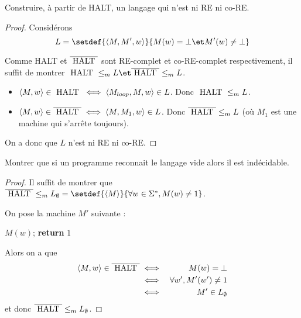 \begin{exercice}
	Construire, à partir de HALT, un langage qui n'est ni RE ni co-RE.
\end{exercice}

\begin{proof}
	Considérons
	$$ L = \setdef {\encode {M,M',w}} {M(w) = \bot \et M'(w) \neq \bot} $$

	Comme HALT et $\overline {\text{ HALT }}$ sont RE-complet et co-RE-complet respectivement, il suffit de montrer $\halt \leqm L \et \overline{\halt} \leqm L$.

	\begin{itemize}
		\item $\left\langle M,w\right\rangle \in \text{ HALT } \iff \left\langle M_{loop}, M, w\right\rangle \in L$. Donc $\text{ HALT } \leq_m L$.
		\item $\left\langle M,w\right\rangle \in \overline{\text{ HALT }} \iff \left\langle M, M_1, w\right\rangle \in L$. Donc $\overline{\text{ HALT }} \leq_m L$ (où $M_1$ est une machine qui s'arrête toujours).
	\end{itemize}

	On a donc que $L$ n'est ni RE ni co-RE.
\end{proof}

\begin{exercice}
	Montrer que si un programme reconnait le langage vide alors il est indécidable.
\end{exercice}

\begin{proof}
	Il suffit de montrer que $\overline{\halt} \leqm L_{\emptyset} = \setdef{\encode M} {\forall w \in \mots, M(w) \neq 1}$.

	On pose la machine $M'$ suivante :
	\begin{algorithmic}[lines]
		\State $M(w)$;
		\State \textbf{return} $1$
		\EndFunction
	\end{algorithmic}

	Alors on a que
	\begin{eqnarray*}
		\left\langle M,w\right\rangle \in \overline{\text{ HALT }} &\iff& M(w) = \bot \\
		&\iff& \forall w', M'(w') \neq 1 \\
		&\iff& M' \in L_{\emptyset}
	\end{eqnarray*} et donc $\overline{\text{ HALT }} \leq_m L_{\emptyset}$.

\end{proof}

